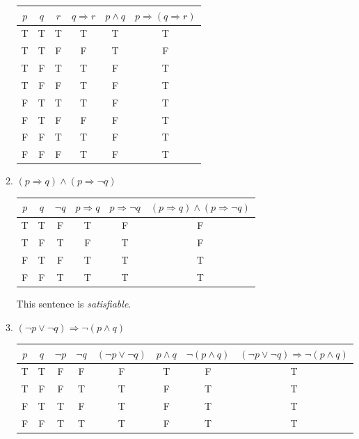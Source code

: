 \documentclass{article}
\begin{document}
\begin{enumerate}
\begin{enumerate}
					\begin{tabular}{|c|c|c|c|c|c|}
						\hline
						$p$ & $q$ & $r$ & $q \Rightarrow r$ & $p \wedge q$ & $p \Rightarrow (q \Rightarrow r)$\\
						\hline
						T & T & T & T & T & T\\
						\hline 
						T & T & F & F & T & F\\
						\hline
						T & F & T & T & F & T\\
						\hline
						T & F & F & T & F & T\\
						\hline
						F & T & T & T & F & T\\
						\hline
						F & T & F & F & F & T\\
						\hline
						F & F & T & T & F & T\\
						\hline
						F & F & F & T & F & T\\
						\hline
					\end{tabular}

				\item $(p \Rightarrow q) \wedge ( p \Rightarrow \neg q)$

					\begin{tabular}{|c|c|c|c|c|c|}
						\hline
						$p$ & $q$ & $\neg q$ & $p \Rightarrow q$ & $p \Rightarrow \neg q$ 
						& $(p \Rightarrow q) \wedge ( p \Rightarrow \neg q)$ \\
						\hline
						T & T & F & T & F & F\\
						\hline
						T & F & T & F & T & F\\
						\hline
						F & T & F & T & T & T\\
						\hline
						F & F & T & T & T & T\\
						\hline
					\end{tabular}

					This sentence is \emph{satisfiable}.

				\item $(\neg p \vee \neg q) \Rightarrow \neg (p \wedge q)$

					\begin{tabular}{|c|c|c|c|c|c|c|c|}
						\hline
						$p$ & $q$ & $\neg p$ & $\neg q$ & $(\neg p \vee \neg q)$ & $p \wedge q$ & $\neg(p \wedge q)$ &
						$(\neg p \vee \neg q) \Rightarrow \neg (p \wedge q)$\\
						\hline
						T & T & F & F & F & T & F & T\\
						\hline
						T & F & F & T & T & F & T & T\\
						\hline
						F & T & T & F & T & F & T & T\\
						\hline
						F & F & T & T & T & F & T & T\\
						\hline


\end{tabular}
\end{enumerate}
\end{enumerate}
\end{document}

